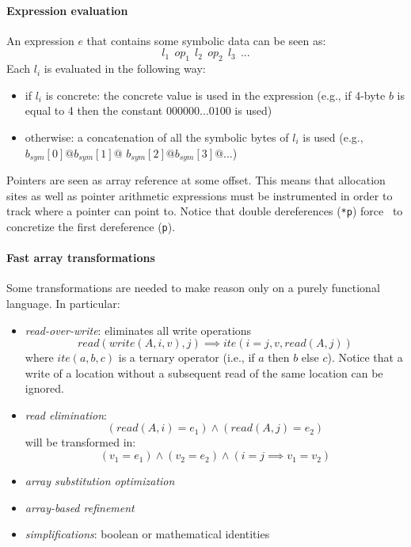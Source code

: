 \paragraph{Expression evaluation} An expression $e$ that contains some symbolic data can be seen as:
\[ l_1~~op_1~~l_2~~op_2~~l_3~~... \]
Each $l_i$ is evaluated in the following way:
\begin{itemize}
  \item if $l_i$ is concrete: the concrete value is used in the expression (e.g., if 4-byte $b$ is equal to 4 then the constant $000000...0100$ is used)
  \item otherwise: a concatenation of all the symbolic bytes of $l_i$ is used (e.g., $b_{sym}[0] @b_{sym}[1] @ $ $b_{sym}[2] @ b_{sym}[3] @ ...$)
\end{itemize}
Pointers are seen as array reference at some offset. This means that allocation sites as well as pointer arithmetic expressions must be instrumented in order to track where a pointer can point to. Notice that double dereferences ({\tt **p}) force~\cite{STP-TR07} to concretize the first dereference ({\tt *p}). 

\paragraph{Fast array transformations} Some transformations are needed to make\cite{STP-TR07} reason only on a purely functional language. In particular:
\begin{itemize}
  \item {\em read-over-write}: eliminates all write operations
    \[ read(write(A, i, v), j) \implies ite(i = j, v, read(A, j)) \]
    where $ite(a,b,c)$ is a ternary operator (i.e., if $a$ then $b$ else $c$). Notice that a write of a location without a subsequent read of the same location can be ignored.
  \item {\em read elimination}:
    \[ (read(A, i) = e_1) \wedge (read(A, j) = e_2) \]
    will be transformed in:
    \[ (v_1 = e_1) \wedge (v_2 = e_2) \wedge (i=j \implies v_1 = v_2) \]
  \item {\em array substitution optimization}
  \item {\em array-based refinement}
  \item {\em simplifications}: boolean or mathematical identities
\end{itemize} 


